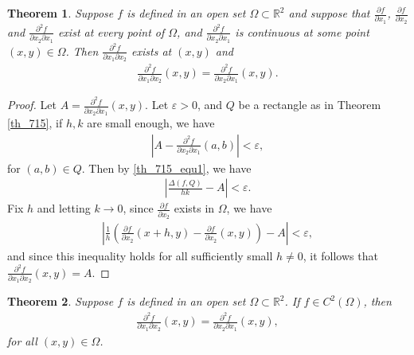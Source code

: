 \documentclass[10pt]{book}
\newtheorem{theorem}{Theorem}[chapter]
\theoremstyle{definition}
\numberwithin{equation}{chapter}
\begin{document}
\medskip

\begin{theorem}
Suppose $f$ is defined in an open set $\Omega \subset \mathbb{R}^2$ and suppose that $\frac{\partial f}{\partial x_1}$, $\frac{\partial f}{\partial x_2}$ and $\frac{\partial^2 f}{\partial x_2 \partial x_1}$  exist at every point of $\Omega$, and $\frac{\partial^2 f}{\partial x_2 \partial x_1}$ is continuous at some point $(x,y) \in \Omega$. Then $\frac{\partial^2 f}{\partial x_1 \partial x_2}$ exists at $(x,y)$ and 
\begin{align*}
    \frac{\partial^2 f}{\partial x_1 \partial x_2}(x,y) = \frac{\partial^2 f}{\partial x_2 \partial x_1}(x,y).
\end{align*}
\end{theorem}
\begin{proof}
Let $A = \frac{\partial^2 f}{\partial x_2 \partial x_1}(x,y)$. Let $\varepsilon > 0$, and $Q$ be a rectangle as in Theorem \ref{th_715}, if $h,k$ are small enough, we have
\begin{align*}
    \left|A - \frac{\partial^2 f}{\partial x_2 \partial x_1}(a,b)\right| < \varepsilon,
\end{align*}
for $(a,b) \in Q$. Then by \eqref{th_715_equ1}, we have
\begin{align*}
    \left|\frac{\Delta (f,Q)}{hk} - A\right| < \varepsilon.
\end{align*}
Fix $h$ and letting $k \to 0$, since $\frac{\partial f}{\partial x_2}$ exists in $\Omega$, we have
\begin{align*}
    \left|\frac{1}{h}\left(\frac{\partial f}{\partial x_2}(x+h,y) - \frac{\partial f}{\partial x_2}(x,y)\right) - A\right| < \varepsilon,
\end{align*}
and since this inequality holds for all sufficiently small $h \neq 0$, it follows that $\frac{\partial^2 f}{\partial x_1 \partial x_2}(x,y) = A$.
\end{proof}

\medskip

\begin{theorem}\label{th_717}
Suppose $f$ is defined in an open set $\Omega \subset \mathbb{R}^2$. If $f \in C^2(\Omega)$, then
\begin{align*}
    \frac{\partial^2 f}{\partial x_1 \partial x_2}(x,y) = \frac{\partial^2 f}{\partial x_2 \partial x_1}(x,y),
\end{align*}
for all $(x,y) \in \Omega$.
\end{theorem}

\medskip
\end{document}
